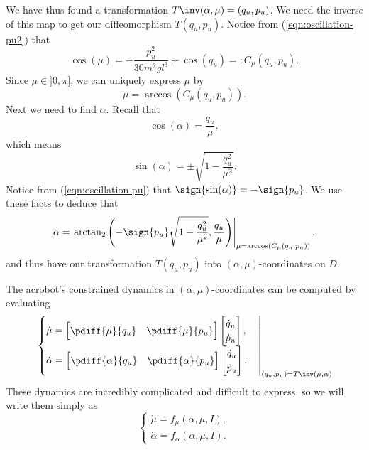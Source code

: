 We have thus found a transformation \(T\inv(\alpha,\mu) = (q_u,p_u)\).
We need the inverse of this map to get our diffeomorphism \(T(q_u,p_u)\).
Notice from (\ref{eqn:oscillation-pu2}) that
\[
    \cos(\mu) = -\frac{p_u^2}{30m^2gl^3} + \cos(q_u) =: C_\mu(q_u,p_u)
    .
\]
Since \(\mu \in ]0,\pi]\), we can uniquely express \(\mu\) by
\begin{equation}\label{eqn:mu-qupu}
    \mu = \arccos\left(C_\mu(q_u,p_u)\right)
    .
\end{equation}
Next we need to find \(\alpha\). 
Recall that 
\[
    \cos(\alpha) = \frac{q_u}{\mu}
    ,
\] 
which means 
\[
    \sin(\alpha) = \pm \sqrt{1 - \frac{q_u^2}{\mu^2}}
    .
\]
Notice from (\ref{eqn:oscillation-pu}) that 
\(\sign{\sin(\alpha)} = -\sign{p_u}\).
We use these facts to deduce that
\begin{equation}\label{eqn:alpha-qupu}
    \alpha = \left.
        \arctan_2\left( -\sign{p_u}\sqrt{1 - \frac{q_u^2}{\mu^2}}, \frac{q_u}{\mu}\right)
        \right|_{\mu = \arccos(C_\mu(q_u,p_u))}
    ,
\end{equation}
and thus have our transformation \(T(q_u,p_u)\) into
\((\alpha,\mu)\)-coordinates on \(D\).

The acrobot's constrained dynamics in
\((\alpha,\mu)\)-coordinates can be computed by evaluating
\[
    \left.\begin{cases}
        \dot{\mu} = 
        \begin{bmatrix} \pdiff{\mu}{q_u} & \pdiff{\mu}{p_u} \end{bmatrix}
        \begin{bmatrix} \dot{q}_u \\ \dot{p}_u \end{bmatrix}
        , \\
        \dot{\alpha} = \begin{bmatrix} \pdiff{\alpha}{q_u} & \pdiff{\alpha}{p_u} \end{bmatrix}
        \begin{bmatrix} \dot{q}_u \\ \dot{p}_u \end{bmatrix}
        .
    \end{cases} \right|_{(q_u,p_u) = T\inv(\mu,\alpha)}
\]
These dynamics are incredibly complicated and difficult to express, so we will
write them simply as
\[
    \begin{cases}
        \dot{\mu} = f_\mu(\alpha,\mu,I)
        ,\\
        \dot{\alpha} = f_\alpha(\alpha,\mu,I)
        .
    \end{cases}
\]

